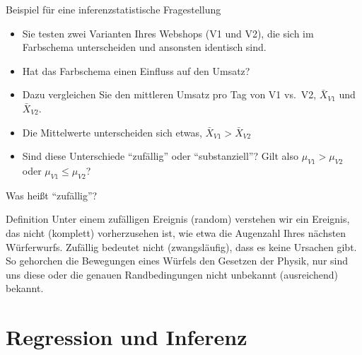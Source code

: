 \documentclass[
  ngerman,
  ignorenonframetext,
]{beamer}
\begin{document}
\begin{frame}{Beispiel für eine inferenzstatistische Fragestellung}
\protect\hypertarget{beispiel-fuxfcr-eine-inferenzstatistische-fragestellung}{}
\begin{itemize}
\item
  Sie testen zwei Varianten Ihres Webshops (V1 und V2), die sich im
  Farbschema unterscheiden und ansonsten identisch sind.
\item
  Hat das Farbschema einen Einfluss auf den Umsatz?
\item
  Dazu vergleichen Sie den mittleren Umsatz pro Tag von V1 vs.~V2,
  \(\bar{X}_{V1}\) und \(\bar{X}_{V2}\).
\item
  Die Mittelwerte unterscheiden sich etwas,
  \(\bar{X}_{V1} > \bar{X}_{V2}\)
\item
  Sind diese Unterschiede ``zufällig'' oder ``substanziell''? Gilt also
  \(\mu_{V1} > \mu_{V2}\) oder \(\mu_{V1} \le \mu_{V2}\)?
\end{itemize}
\end{frame}

\begin{frame}{Was heißt ``zufällig''?}
\protect\hypertarget{was-heiuxdft-zufuxe4llig}{}
\begin{alertblock}{Definition}
Unter einem zufälligen Ereignis (random) verstehen wir ein Ereignis, das nicht (komplett) vorherzusehen ist, wie etwa die Augenzahl Ihres nächsten Würferwurfs. Zufällig bedeutet nicht (zwangsläufig), dass es keine Ursachen gibt. So gehorchen die Bewegungen eines Würfels den Gesetzen der Physik, nur sind uns diese oder die genauen Randbedingungen nicht unbekannt (ausreichend) bekannt.
\end{alertblock}
\end{frame}

\hypertarget{regression-und-inferenz}{%
\section{Regression und Inferenz}\label{regression-und-inferenz}}
\end{document}
